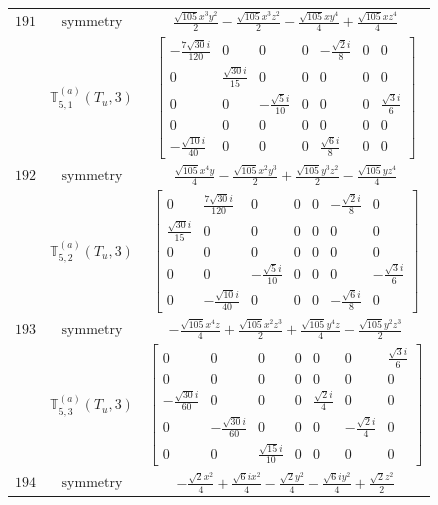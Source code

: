 \documentclass[fleqn,8pt,landscape]{jsarticle}
\begin{document}
\begin{longtable}{ccc}
$ 191 $ & $ \text{symmetry} $ & $ \frac{\sqrt{105} x^{3} y^{2}}{2} - \frac{\sqrt{105} x^{3} z^{2}}{2} - \frac{\sqrt{105} x y^{4}}{4} + \frac{\sqrt{105} x z^{4}}{4} $ \\
$  $ & $ \mathbb{T}_{5,1}^{(a)}(T_{u},3) $ & $ \begin{bmatrix} - \frac{7 \sqrt{30} i}{120} & 0 & 0 & 0 & - \frac{\sqrt{2} i}{8} & 0 & 0 \\ 0 & \frac{\sqrt{30} i}{15} & 0 & 0 & 0 & 0 & 0 \\ 0 & 0 & - \frac{\sqrt{5} i}{10} & 0 & 0 & 0 & \frac{\sqrt{3} i}{6} \\ 0 & 0 & 0 & 0 & 0 & 0 & 0 \\ - \frac{\sqrt{10} i}{40} & 0 & 0 & 0 & \frac{\sqrt{6} i}{8} & 0 & 0 \end{bmatrix} $ \\ \hline
$ 192 $ & $ \text{symmetry} $ & $ \frac{\sqrt{105} x^{4} y}{4} - \frac{\sqrt{105} x^{2} y^{3}}{2} + \frac{\sqrt{105} y^{3} z^{2}}{2} - \frac{\sqrt{105} y z^{4}}{4} $ \\
$  $ & $ \mathbb{T}_{5,2}^{(a)}(T_{u},3) $ & $ \begin{bmatrix} 0 & \frac{7 \sqrt{30} i}{120} & 0 & 0 & 0 & - \frac{\sqrt{2} i}{8} & 0 \\ \frac{\sqrt{30} i}{15} & 0 & 0 & 0 & 0 & 0 & 0 \\ 0 & 0 & 0 & 0 & 0 & 0 & 0 \\ 0 & 0 & - \frac{\sqrt{5} i}{10} & 0 & 0 & 0 & - \frac{\sqrt{3} i}{6} \\ 0 & - \frac{\sqrt{10} i}{40} & 0 & 0 & 0 & - \frac{\sqrt{6} i}{8} & 0 \end{bmatrix} $ \\ \hline
$ 193 $ & $ \text{symmetry} $ & $ - \frac{\sqrt{105} x^{4} z}{4} + \frac{\sqrt{105} x^{2} z^{3}}{2} + \frac{\sqrt{105} y^{4} z}{4} - \frac{\sqrt{105} y^{2} z^{3}}{2} $ \\
$  $ & $ \mathbb{T}_{5,3}^{(a)}(T_{u},3) $ & $ \begin{bmatrix} 0 & 0 & 0 & 0 & 0 & 0 & \frac{\sqrt{3} i}{6} \\ 0 & 0 & 0 & 0 & 0 & 0 & 0 \\ - \frac{\sqrt{30} i}{60} & 0 & 0 & 0 & \frac{\sqrt{2} i}{4} & 0 & 0 \\ 0 & - \frac{\sqrt{30} i}{60} & 0 & 0 & 0 & - \frac{\sqrt{2} i}{4} & 0 \\ 0 & 0 & \frac{\sqrt{15} i}{10} & 0 & 0 & 0 & 0 \end{bmatrix} $ \\ \hline
$ 194 $ & $ \text{symmetry} $ & $ - \frac{\sqrt{2} x^{2}}{4} + \frac{\sqrt{6} i x^{2}}{4} - \frac{\sqrt{2} y^{2}}{4} - \frac{\sqrt{6} i y^{2}}{4} + \frac{\sqrt{2} z^{2}}{2} $ \\

\end{longtable}
\end{document}
